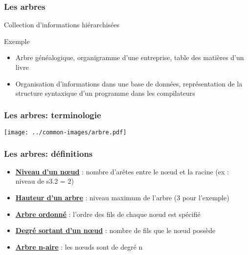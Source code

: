 \documentclass[table,handout,tikz,12pt,svgnames]{beamer}
\subtitle{\LARGE Les Arbres}
\date{CM7}
\begin{document}
\begin{frame}
	\titlepage
\end{frame}

\begin{frame}[fragile=singleslide]
	\frametitle{Les arbres}
		\begin{block}{Collection d'informations hiérarchisées}
		\end{block}
		\begin{block}{Exemple}
			\begin{itemize}
				\item Arbre généalogique, organigramme d'une entreprise, table des matières d'un livre
				\item Organisation d'informations dans une base de données, représentation de la structure syntaxique d'un programme dans les compilateurs
			\end{itemize}
		\end{block}
\end{frame}


\begin{frame}[fragile=singleslide]
	\frametitle{Les arbres: terminologie}
	\vspace{-4em}
	\begin{block}{}
    \begin{adjustwidth}{-0.9cm}{}

		\begin{center}
		{\texttt{[image: ../common-images/arbre.pdf]}}
		\end{center}
	\end{adjustwidth}
	\end{block}
\end{frame}


\begin{frame}[fragile=singleslide]
	\frametitle{Les arbres: définitions}
	\begin{block}{}
		\begin{itemize}
			\item \underline{\textbf{Niveau d'un nœud}} : nombre d'arêtes entre le nœud et la racine (ex : niveau de s3.2 = 2)
			\item \underline{\textbf{Hauteur d'un arbre}} : niveau maximum de l'arbre (3 pour l'exemple)
			\item \underline{\textbf{Arbre ordonné}} : l'ordre des fils de chaque nœud est spécifié
			\item \underline{\textbf{Degré sortant d'un nœud}} : nombre de fils que le nœud possède
			\item \underline{\textbf{Arbre n-aire}} : les nœuds sont de degré n
		\end{itemize}
	\end{block}
\end{frame}
\end{document}
